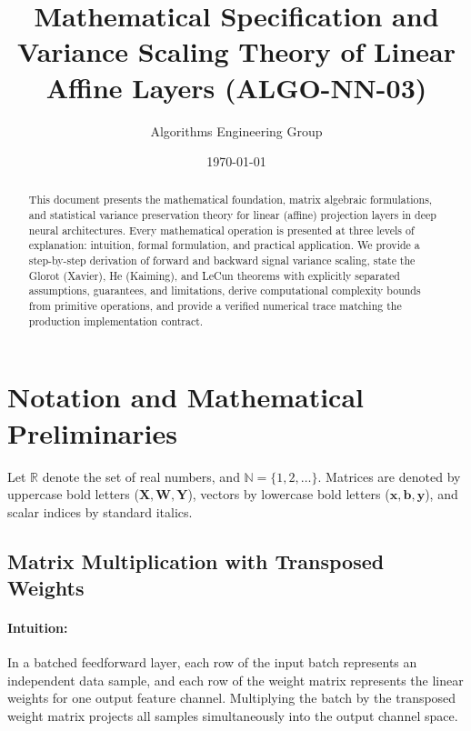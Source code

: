 \documentclass[11pt]{article}
\title{Mathematical Specification and Variance Scaling Theory of Linear Affine Layers (ALGO-NN-03)}
\author{Algorithms Engineering Group}
\date{\today}
\begin{document}
\maketitle

\begin{abstract}
This document presents the mathematical foundation, matrix algebraic formulations, and statistical variance preservation theory for linear (affine) projection layers in deep neural architectures. Every mathematical operation is presented at three levels of explanation: intuition, formal formulation, and practical application. We provide a step-by-step derivation of forward and backward signal variance scaling, state the Glorot (Xavier), He (Kaiming), and LeCun theorems with explicitly separated assumptions, guarantees, and limitations, derive computational complexity bounds from primitive operations, and provide a verified numerical trace matching the production implementation contract.
\end{abstract}

\section{Notation and Mathematical Preliminaries}
\label{sec:notation}

Let $\mathbb{R}$ denote the set of real numbers, and $\mathbb{N} = \{1, 2, \dots\}$. Matrices are denoted by uppercase bold letters ($\mathbf{X}, \mathbf{W}, \mathbf{Y}$), vectors by lowercase bold letters ($\mathbf{x}, \mathbf{b}, \mathbf{y}$), and scalar indices by standard italics.

\subsection{Matrix Multiplication with Transposed Weights}
\paragraph{Intuition:} In a batched feedforward layer, each row of the input batch represents an independent data sample, and each row of the weight matrix represents the linear weights for one output feature channel. Multiplying the batch by the transposed weight matrix projects all samples simultaneously into the output channel space.
\end{document}
